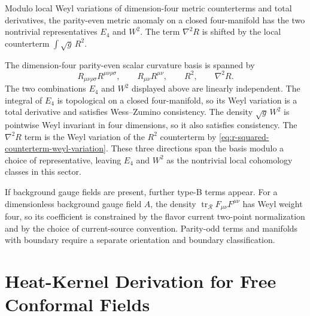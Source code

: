 \begin{remark}
\label{rem:curved-four-dimensional-weyl-classes}
Modulo local Weyl variations of dimension-four metric counterterms and total
derivatives, the parity-even metric anomaly on a closed four-manifold has the
two nontrivial representatives \(E_4\) and \(W^2\).  The term
\(\nabla^2R\) is shifted by the local counterterm \(\int\sqrt g\,R^2\).
\end{remark}

The dimension-four parity-even scalar curvature basis is spanned by
\[
  R_{\mu\nu\rho\sigma}R^{\mu\nu\rho\sigma},
  \qquad
  R_{\mu\nu}R^{\mu\nu},
  \qquad
  R^2,
  \qquad
  \nabla^2R .
\]
The two combinations \(E_4\) and \(W^2\) displayed above are linearly
independent.  The integral of \(E_4\) is topological on a closed
four-manifold, so its Weyl variation is a total derivative and satisfies
Wess--Zumino consistency.  The density \(\sqrt g\,W^2\) is pointwise Weyl
invariant in four dimensions, so it also satisfies consistency.  The
\(\nabla^2R\) term is the Weyl variation of the \(R^2\) counterterm by
\eqref{eq:r-squared-counterterm-weyl-variation}.  These three directions
span the basis modulo a choice of representative, leaving \(E_4\) and \(W^2\)
as the nontrivial local cohomology classes in this sector.

If background gauge fields are present, further type-B terms appear.  For a
dimensionless background gauge field \(A\), the density
\(\operatorname{tr}_{\mathcal R}F_{\mu\nu}F^{\mu\nu}\) has Weyl weight four,
so its coefficient is constrained by the flavor current two-point
normalization and by the choice of current-source convention.  Parity-odd
terms and manifolds with boundary require a separate orientation and boundary
classification.

\section{Heat-Kernel Derivation for Free Conformal Fields}

